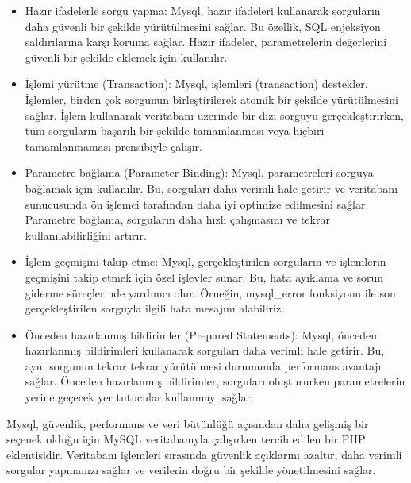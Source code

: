 \begin{itemize}
\item Hazır ifadelerle sorgu yapma: Mysql, hazır ifadeleri kullanarak sorguların daha güvenli bir şekilde yürütülmesini sağlar. Bu özellik, SQL enjeksiyon saldırılarına karşı koruma sağlar. Hazır ifadeler, parametrelerin değerlerini güvenli bir şekilde eklemek için kullanılır.

\item İşlemi yürütme (Transaction): Mysql, işlemleri (transaction) destekler. İşlemler, birden çok sorgunun birleştirilerek atomik bir şekilde yürütülmesini sağlar. İşlem kullanarak veritabanı üzerinde bir dizi sorguyu gerçekleştirirken, tüm sorguların başarılı bir şekilde tamamlanması veya hiçbiri tamamlanmaması prensibiyle çalışır.

\item Parametre bağlama (Parameter Binding): Mysql, parametreleri sorguya bağlamak için kullanılır. Bu, sorguları daha verimli hale getirir ve veritabanı sunucusunda ön işlemci tarafından daha iyi optimize edilmesini sağlar. Parametre bağlama, sorguların daha hızlı çalışmasını ve tekrar kullanılabilirliğini artırır.

\item İşlem geçmişini takip etme: Mysql, gerçekleştirilen sorguların ve işlemlerin geçmişini takip etmek için özel işlevler sunar. Bu, hata ayıklama ve sorun giderme süreçlerinde yardımcı olur. Örneğin, mysql\_error fonksiyonu ile son gerçekleştirilen sorguyla ilgili hata mesajını alabiliriz.

\item Önceden hazırlanmış bildirimler (Prepared Statements): Mysql, önceden hazırlanmış bildirimleri kullanarak sorguları daha verimli hale getirir. Bu, aynı sorgunun tekrar tekrar yürütülmesi durumunda performans avantajı sağlar. Önceden hazırlanmış bildirimler, sorguları oluştururken parametrelerin yerine geçecek yer tutucular kullanmayı sağlar.
\end{itemize}
Mysql, güvenlik, performans ve veri bütünlüğü açısından daha gelişmiş bir seçenek olduğu için MySQL veritabanıyla çalışırken tercih edilen bir PHP eklentisidir. Veritabanı işlemleri sırasında güvenlik açıklarını azaltır, daha verimli sorgular yapmanızı sağlar ve verilerin doğru bir şekilde yönetilmesini sağlar.



